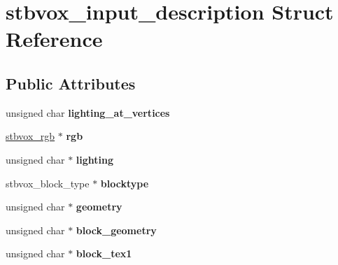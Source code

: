 \hypertarget{structstbvox__input__description}{}\section{stbvox\+\_\+input\+\_\+description Struct Reference}
\label{structstbvox__input__description}
\subsection*{Public Attributes}
\begin{DoxyCompactItemize}
\item 
unsigned char {\bfseries lighting\+\_\+at\+\_\+vertices}\hypertarget{structstbvox__input__description_a7cf0e2be2bcfa65b42ad93b2f9d50cce}{}\label{structstbvox__input__description_a7cf0e2be2bcfa65b42ad93b2f9d50cce}

\item 
\hyperlink{structstbvox__rgb}{stbvox\+\_\+rgb} $\ast$ {\bfseries rgb}\hypertarget{structstbvox__input__description_a11f615f5ab58ad76c16e1363b614e697}{}\label{structstbvox__input__description_a11f615f5ab58ad76c16e1363b614e697}

\item 
unsigned char $\ast$ {\bfseries lighting}\hypertarget{structstbvox__input__description_a6b64e4cf0061bfe6dbae7981a002ab77}{}\label{structstbvox__input__description_a6b64e4cf0061bfe6dbae7981a002ab77}

\item 
stbvox\+\_\+block\+\_\+type $\ast$ {\bfseries blocktype}\hypertarget{structstbvox__input__description_a68f6d2ab5ba77e7e80021d60a2af7019}{}\label{structstbvox__input__description_a68f6d2ab5ba77e7e80021d60a2af7019}

\item 
unsigned char $\ast$ {\bfseries geometry}\hypertarget{structstbvox__input__description_a18e00a30f954f1ab1a1a5ad69e35b8ee}{}\label{structstbvox__input__description_a18e00a30f954f1ab1a1a5ad69e35b8ee}

\item 
unsigned char $\ast$ {\bfseries block\+\_\+geometry}\hypertarget{structstbvox__input__description_acdcebc8d321327f365bbd3a3468f7f2d}{}\label{structstbvox__input__description_acdcebc8d321327f365bbd3a3468f7f2d}

\item 
unsigned char $\ast$ {\bfseries block\+\_\+tex1}\hypertarget{structstbvox__input__description_a3f1201a36283ef12036d5b3cd02a6d51}{}\label{structstbvox__input__description_a3f1201a36283ef12036d5b3cd02a6d51}


\end{DoxyCompactItemize}
